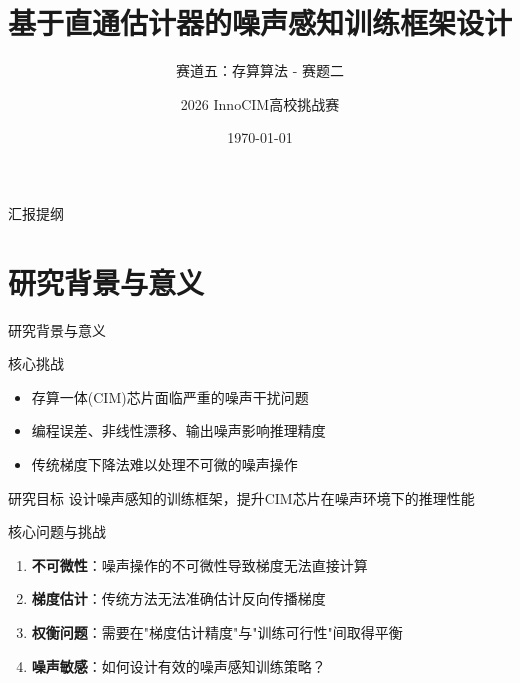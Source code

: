 \documentclass[aspectratio=169]{beamer}
\title[STE噪声感知训练框架]
{基于直通估计器的噪声感知训练框架设计}
\subtitle{赛道五：存算算法 - 赛题二}
\author{2026 InnoCIM高校挑战赛}
\institute{}
\date{\today}
\begin{document}
\frame{\titlepage}

\begin{frame}{汇报提纲}
\tableofcontents
\end{frame}

\section{研究背景与意义}
\begin{frame}{研究背景与意义}
\begin{block}{核心挑战}
\begin{itemize}
\item 存算一体(CIM)芯片面临严重的噪声干扰问题
\item 编程误差、非线性漂移、输出噪声影响推理精度
\item 传统梯度下降法难以处理不可微的噪声操作
\end{itemize}
\end{block}
\vfill
\begin{block}{研究目标}
设计噪声感知的训练框架，提升CIM芯片在噪声环境下的推理性能
\end{block}
\end{frame}

\begin{frame}{核心问题与挑战}
\begin{enumerate}
\item \textbf{不可微性}：噪声操作的不可微性导致梯度无法直接计算
\item \textbf{梯度估计}：传统方法无法准确估计反向传播梯度
\item \textbf{权衡问题}：需要在"梯度估计精度"与"训练可行性"间取得平衡
\item \textbf{噪声敏感}：如何设计有效的噪声感知训练策略？
\end{enumerate}
\end{frame}

\end{document}
